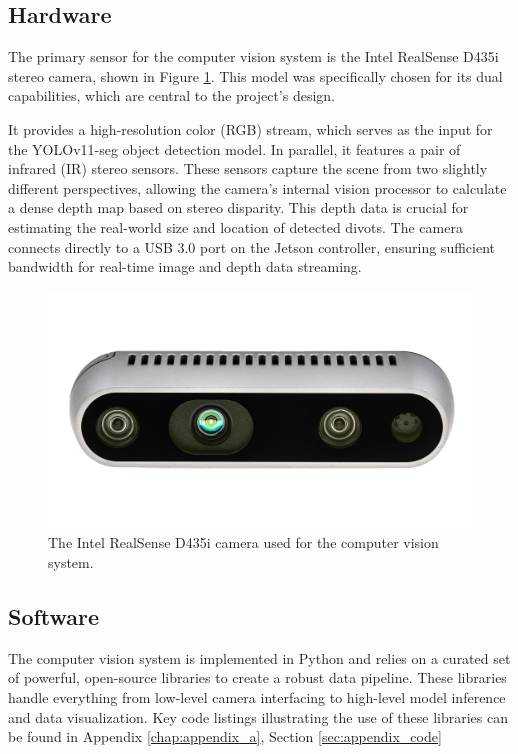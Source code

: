 \subsection{Hardware}
\label{ssec:cv_hardware}
The primary sensor for the computer vision system is the Intel RealSense D435i stereo camera, shown in Figure \ref{fig:realsense_camera}. This model was specifically chosen for its dual capabilities, which are central to the project's design.

It provides a high-resolution color (RGB) stream, which serves as the input for the YOLOv11-seg object detection model. In parallel, it features a pair of infrared (IR) stereo sensors. These sensors capture the scene from two slightly different perspectives, allowing the camera's internal vision processor to calculate a dense depth map based on stereo disparity. This depth data is crucial for estimating the real-world size and location of detected divots. The camera connects directly to a USB 3.0 port on the Jetson controller, ensuring sufficient bandwidth for real-time image and depth data streaming.

\begin{figure}[h!]
    \centering
    \includegraphics[width=0.6\linewidth]{figures/camera.png}
    \caption{The Intel RealSense D435i camera used for the computer vision system.}
    \label{fig:realsense_camera}
\end{figure}

\subsection{Software}
\label{ssec:cv_software}
The computer vision system is implemented in Python and relies on a curated set of powerful, open-source libraries to create a robust data pipeline. These libraries handle everything from low-level camera interfacing to high-level model inference and data visualization. Key code listings illustrating the use of these libraries can be found in Appendix \ref{chap:appendix_a}, Section \ref{sec:appendix_code}

